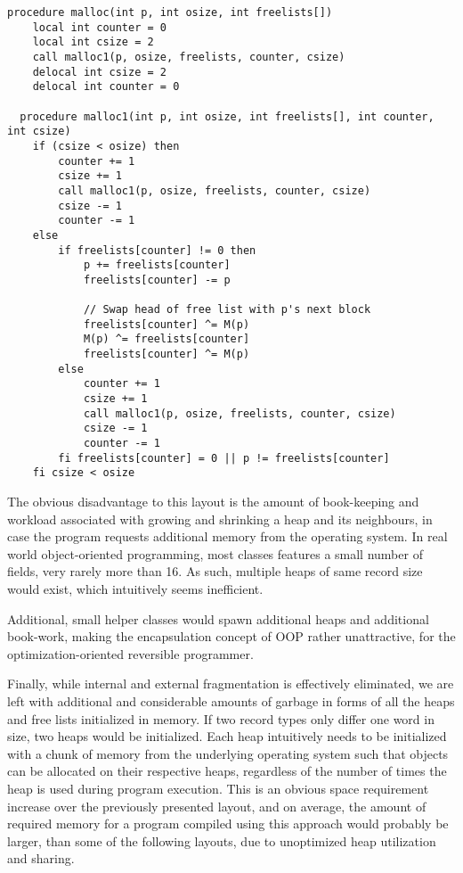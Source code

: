 \begin{lstlisting}[caption={Allocation algorithm for one heap per record size implemented in extended Janus.}, language=janus, style=basic, label={lst:one-heap-per-record-size}]
  procedure malloc(int p, int osize, int freelists[])
    local int counter = 0
    local int csize = 2
    call malloc1(p, osize, freelists, counter, csize)
    delocal int csize = 2
    delocal int counter = 0

  procedure malloc1(int p, int osize, int freelists[], int counter, int csize)
    if (csize < osize) then
        counter += 1
        csize += 1
        call malloc1(p, osize, freelists, counter, csize) 
        csize -= 1
        counter -= 1
    else
        if freelists[counter] != 0 then
            p += freelists[counter]
            freelists[counter] -= p

            // Swap head of free list with p's next block
            freelists[counter] ^= M(p)
            M(p) ^= freelists[counter]
            freelists[counter] ^= M(p)
        else
            counter += 1
            csize += 1
            call malloc1(p, osize, freelists, counter, csize)
            csize -= 1
            counter -= 1
        fi freelists[counter] = 0 || p != freelists[counter]
    fi csize < osize   
\end{lstlisting}

The obvious disadvantage to this layout is the amount of book-keeping and workload associated with growing and shrinking a heap and its neighbours, in case the program requests additional memory from the operating system. In real world object-oriented programming, most classes features a small number of fields, very rarely more than 16. As such, multiple heaps of same record size would exist, which intuitively seems inefficient. 

Additional, small helper classes would spawn additional heaps and additional book-work, making the encapsulation concept of OOP rather unattractive, for the optimization-oriented reversible programmer. 

Finally, while internal and external fragmentation is effectively eliminated, we are left with additional and considerable amounts of garbage in forms of all the heaps and free lists initialized in memory. If two record types only differ one word in size, two heaps would be initialized. Each heap intuitively needs to be initialized with a chunk of memory from the underlying operating system such that objects can be allocated on their respective heaps, regardless of the number of times the heap is used during program execution. This is an obvious space requirement increase over the previously presented layout, and on average, the amount of required memory for a program compiled using this approach would probably be larger, than some of the following layouts, due to unoptimized heap utilization and sharing.


